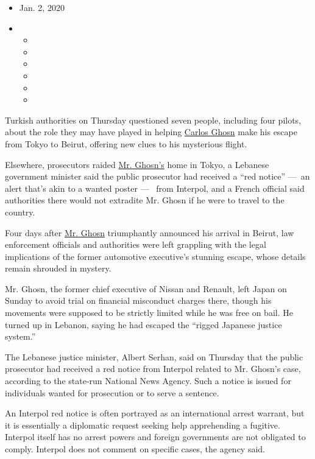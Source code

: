 \begin{itemize}
\item
  Jan. 2, 2020
\item
  \begin{itemize}
  \item
  \item
  \item
  \item
  \item
  \item
  \end{itemize}
\end{itemize}

Turkish authorities on Thursday questioned seven people, including four
pilots, about the role they may have played in helping
\href{https://www.nytimes.com/2020/01/02/business/carlos-ghosn-movie.html}{Carlos
Ghosn} make his escape from Tokyo to Beirut, offering new clues to his
mysterious flight.

Elsewhere, prosecutors raided
\href{https://www.nytimes.com/2020/01/02/business/carlos-ghosn-movie.html}{Mr.
Ghosn's} home in Tokyo, a Lebanese government minister said the public
prosecutor had received a ``red notice'' ---~an alert that's akin to a
wanted poster ---~ from Interpol, and a French official said authorities
there would not extradite Mr. Ghosn if he were to travel to the country.

Four days after
\href{https://www.nytimes.com/2020/01/02/business/carlos-ghosn-movie.html}{Mr.
Ghosn} triumphantly announced his arrival in Beirut, law enforcement
officials and authorities were left grappling with the legal
implications of the former automotive executive's stunning escape, whose
details remain shrouded in mystery.

Mr. Ghosn, the former chief executive of Nissan and Renault, left Japan
on Sunday to avoid trial on financial misconduct charges there, though
his movements were supposed to be strictly limited while he was free on
bail. He turned up in Lebanon, saying he had escaped the ``rigged
Japanese justice system.''

The Lebanese justice minister, Albert Serhan, said on Thursday that the
public prosecutor had received a red notice from Interpol related to Mr.
Ghosn's case, according to the state-run National News Agency. Such a
notice is issued for individuals wanted for prosecution or to serve a
sentence.

An Interpol red notice is often portrayed as an international arrest
warrant, but it is essentially a diplomatic request seeking help
apprehending a fugitive. Interpol itself has no arrest powers and
foreign governments are not obligated to comply. Interpol does not
comment on specific cases, the agency said.

